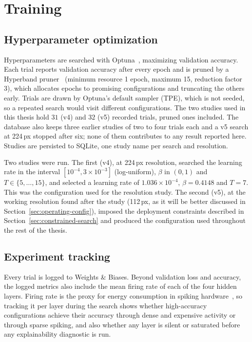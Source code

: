 \section{Training}
\label{sec:training}
 
\subsection{Hyperparameter optimization}
 
Hyperparameters are searched with Optuna~\cite{akiba2019optuna}, maximizing
validation accuracy. Each trial reports validation accuracy after every epoch
and is pruned by a Hyperband pruner~\cite{li2018hyperband} (minimum resource 1
epoch, maximum 15, reduction factor 3), which allocates epochs to promising
configurations and truncating the others early. Trials are drawn by Optuna's
default sampler (TPE), which is not seeded, so a repeated search would visit
different configurations. The two studies used in this thesis hold $31$ (v4) and
$32$ (v5) recorded trials, pruned ones included. The database also keeps three
earlier studies of two to four trials each and a v5 search at 224\,px stopped
after six; none of them contributes to any result reported here. Studies are
persisted to SQLite, one study name per search and resolution.
 
Two studies were run. The first (v4), at 224\,px resolution, searched the learning rate in
the interval $[10^{-4}, 3 \times 10^{-3}]$ (log-uniform), $\beta$ in $(0, 1)$ and
$T \in \{5, \dots, 15\}$, and selected a learning rate of
$1.036 \times 10^{-4}$, $\beta = 0.4148$ and $T = 7$. This was the configuration
used for the resolution study. The second (v5), at the working resolution found
after the study (112\,px, as it will be better discussed in Section~\ref{sec:operating-config}),
imposed the deployment constraints described in
Section~\ref{sec:constrained-search} and produced the configuration used
throughout the rest of the thesis.
 
\subsection{Experiment tracking}
 
Every trial is logged to Weights \& Biases. Beyond validation loss and
accuracy, the logged metrics also include the mean firing rate of each of the four
hidden layers. Firing rate is the proxy for energy consumption in spiking
hardware~\cite{roy2019towards}, so tracking it per layer during the search shows
whether high-accuracy configurations achieve their accuracy through dense and
expensive activity or through sparse spiking, and also whether any layer is silent or
saturated before any explainability diagnostic is run.
 
